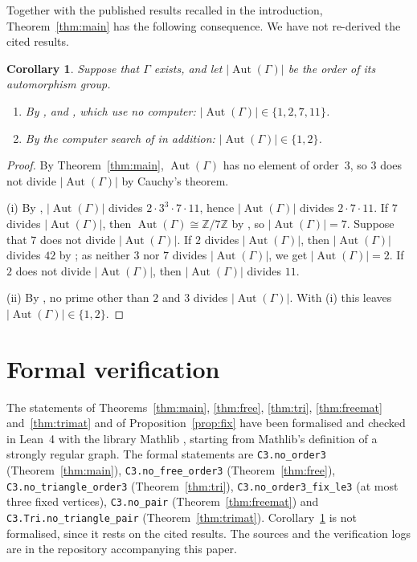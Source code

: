 \documentclass[11pt,a4paper]{article}
\newtheorem{corollary}[theorem]{Corollary}
\theoremstyle{remark}
\newcommand{\ZZ}{\mathbb{Z}}
\newcommand{\Aut}{\operatorname{Aut}}
\newcommand{\oA}{|\Aut(\Gamma)|}
\begin{document}
Together with the published results recalled in the introduction, Theorem~\ref{thm:main} has the following
consequence. We have not re-derived the cited results.

\begin{corollary}\label{cor:aut}
Suppose that $\Gamma$ exists, and let $\oA$ be the order of its automorphism group.
\begin{enumerate}[label=(\roman*)]
\item By \cite{MM04}, \cite{Mak10} and \cite{CW25}, which use no computer: $\oA\in\{1,2,7,11\}$.
\item By the computer search of \cite{B09,BL11} in addition: $\oA\in\{1,2\}$.
\end{enumerate}
\end{corollary}
\begin{proof}
By Theorem~\ref{thm:main}, $\Aut(\Gamma)$ has no element of order~3, so $3$ does not divide $\oA$ by Cauchy's theorem.

(i) By \cite{MM04}, $\oA$ divides $2\cdot3^3\cdot7\cdot11$, hence $\oA$ divides $2\cdot7\cdot11$. If $7$ divides $\oA$,
then $\Aut(\Gamma)\cong\ZZ/7\ZZ$ by \cite{CW25}, so $\oA=7$. Suppose that $7$ does not divide $\oA$. If $2$ divides $\oA$,
then $\oA$ divides $42$ by \cite{Mak10}; as neither $3$ nor $7$ divides $\oA$, we get $\oA=2$. If $2$ does not divide $\oA$,
then $\oA$ divides $11$.

(ii) By \cite{BL11}, no prime other than $2$ and $3$ divides $\oA$. With (i) this leaves $\oA\in\{1,2\}$.
\end{proof}

\section{Formal verification}\label{sec:formal}

The statements of Theorems~\ref{thm:main}, \ref{thm:free}, \ref{thm:tri}, \ref{thm:freemat} and~\ref{thm:trimat} and
of Proposition~\ref{prop:fix} have been formalised and checked in Lean~4 \cite{dMU21} with the library Mathlib
\cite{Mat20}, starting from Mathlib's definition of a strongly regular graph. The formal statements are
\texttt{C3.no\_order3} (Theorem~\ref{thm:main}), \texttt{C3.no\_free\_order3} (Theorem~\ref{thm:free}),
\texttt{C3.no\_triangle\_order3} (Theorem~\ref{thm:tri}), \texttt{C3.no\_order3\_fix\_le3} (at most three fixed
vertices), \texttt{C3.no\_pair} (Theorem~\ref{thm:freemat}) and \texttt{C3.Tri.no\_triangle\_pair}
(Theorem~\ref{thm:trimat}). Corollary~\ref{cor:aut} is not formalised, since it rests on the cited results. The
sources and the verification logs are in the repository accompanying this paper.
\end{document}
